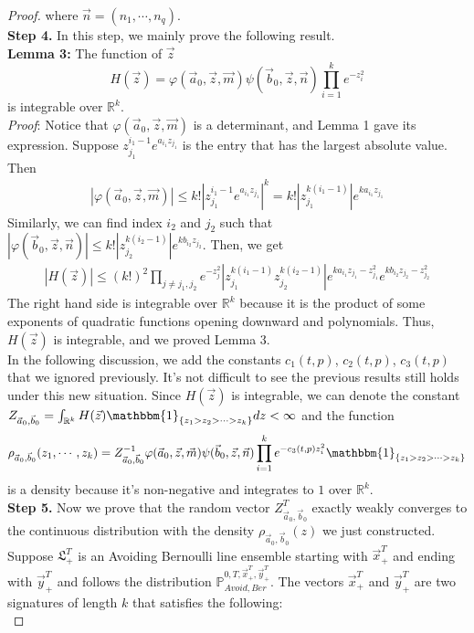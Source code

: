 \begin{proof}
where $\vec{n}=(n_{1},\cdots,n_{q})$.\\
\textbf{Step 4. }In this step, we mainly prove the following result.\\
\textbf{Lemma 3:} The function of $\vec{z}$ $$H(\vec{z})=\varphi(\vec{a}_{0},\vec{z},\vec{m})\psi(\vec{b}_{0},\vec{z},\vec{n})\prod_{i=1}^{k}e^{-z_{i}^{2}}$$ is integrable over $\mathbb{R}^{k}$.\\
\emph{Proof}: Notice that $\varphi(\vec{a}_{0},\vec{z},\vec{m})$ is a determinant, and Lemma 1 gave its expression. Suppose $z_{j_1}^{i_1-1}e^{a_{i_1}z_{j_1}}$ is the entry that has the largest absolute value. Then 
\begin{align*}
	|\varphi(\vec{a}_{0},\vec{z},\vec{m})|\leqslant k!|z_{j_{1}}^{i_{1}-1}e^{a_{i_1}z_{j_1}}|^{k}=k!|z_{j_1}^{k(i_1-1)}|e^{ka_{i_1}z_{j_1}}
\end{align*}
Similarly, we can find index $i_2$ and $j_{2}$ such that $|\varphi(\vec{b}_{0},\vec{z},\vec{n})|\leqslant k!|z_{j_2}^{k(i_2-1)}|e^{kb_{i_2}z_{j_2}}$. Then, we get 
\begin{align*}
	|H(\vec{z})|\leqslant (k!)^{2}\prod_{j\neq j_1,j_2}e^{-z_{j}^{2}}|z_{j_1}^{k(i_1-1)}z_{j_2}^{k(i_2-1)}|e^{ka_{i_1}z_{j_1}-z_{j_1}^2}e^{kb_{i_2}z_{j_2}-z_{j_2}^{2}}
\end{align*}
The right hand side is integrable over $\mathbb{R}^{k}$ because it is the product of some exponents of quadratic functions opening downward and polynomials. Thus, $H(\vec{z})$ is integrable, and we proved Lemma 3.\\
In the following discussion, we add the constants $c_{1}(t,p)$, $c_{2}(t,p)$, $c_{3}(t,p)$ that we ignored previously. It's not difficult to see the previous results still holds under this new situation. Since $H(\vec{z})$ is integrable, we can denote the constant $Z_{\vec{a}_{0},\vec{b}_{0}}=\int_{\mathbb{R}^{k}}H(\vec{z})\mathbbm{1}_{\{z_1>z_2>\cdots>z_{k}\}}dz<\infty$ and the function $$\rho_{\vec{a}_{0},\vec{b}_{0}}(z_{1},\cdots,z_{k})=Z_{\vec{a}_{0},\vec{b}_{0}}^{-1}\varphi(\vec{a}_{0},\vec{z},\vec{m})\psi(\vec{b}_{0},\vec{z},\vec{n})\prod_{i=1}^{k}e^{-c_{3}(t,p)z_{i}^{2}}\mathbbm{1}_{\{z_1>z_2>\cdots>z_{k}\}}$$
is a density because it's non-negative and integrates to $1$ over $\mathbb{R}^{k}$.\\
\textbf{Step 5. }Now we prove that the random vector $Z^{T}_{\vec{a}_{0},\vec{b}_{0}}$ exactly weakly converges to the continuous distribution with the density $\rho_{\vec{a}_{0},\vec{b}_{0}}(z)$ we just constructed. Suppose $\mathfrak{L}_{+}^{T}$ is an Avoiding Bernoulli line ensemble starting with $\vec{x}^{T}_{+}$ and ending with $\vec{y}^{T}_{+}$ and follows the distribution $\mathbb{P}_{Avoid,Ber}^{0,T,\vec{x}^{T}_{+},\vec{y}^{T}_{+}}$. The vectors $\vec{x}^{T}_{+}$ and $\vec{y}^{T}_{+}$ are two signatures of length $k$ that satisfies the following:\\

\end{proof}

